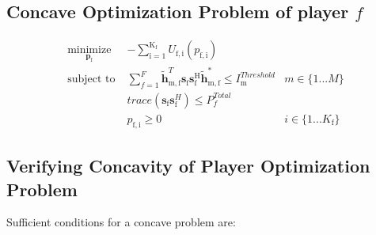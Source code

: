 \documentclass[12pt,a4paper]{report}
\begin{document}
\subsection{Concave Optimization Problem of player $f$}


	\begin{subequations}
	\label{optim}
	\begin{align}
	    \underset{\mathbf{p}_{\mathrm{f}} }{\text{minimize}} \;
	    & - \sum_{\mathrm{i=1}}^{\mathrm{K_f}}
    	U_{\mathrm{f,i}}(p_{\mathrm{f,i}}) \label{player_opt} \\
	    \text{subject to} \; &
	  \sum^F_{f=1} \mathbf{\tilde{h}}_{\mathrm{m,f}}^T  \mathbf{s}_{\mathrm{f}} 						
	\mathbf{s_{\mathrm{f}}^{\mathrm{H}}} \mathbf{\tilde{h}_{\mathrm{m,f}}^*} \leq I^{Threshold}		
	_{\mathrm{m}} & m \in \{1 ...M\} 
		\label{interference_const}\\
        & trace(\mathbf{s}_\mathrm{f}\mathbf{s}_\mathrm{f}^H)  \leq P^{Total}_{f}  \label{power_const}\\
        & p_{\mathrm{f,i}} \geq 0 &  i \in \{1 ...K_{\mathrm{f}}\} \label{pos_power_const}
	\end{align}
	\end{subequations}


\subsection{Verifying Concavity of Player Optimization Problem}

Sufficient conditions for a concave problem are:
\end{document}
